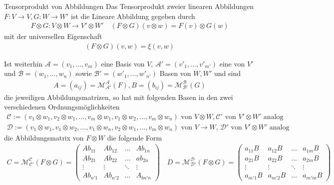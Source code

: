 \begin{definition}{Tensorprodukt von Abbildungen}
    Das Tensorprodukt zweier linearen Abbildungen $F: V \to V, G: W \to W'$ ist die Lineare Abbildung gegeben durch
    \begin{align*}
        F \otimes G: V \otimes W \to V' \otimes W' \quad (F \otimes G)(v \otimes w) = F(v) \otimes G(w)
    \end{align*}
    mit der universellen Eigenschaft 
    \begin{align*}
        (F \otimes G)(v,w) = \xi(v,w)
    \end{align*}
\end{definition}
Ist weiterhin $\mathcal{A} = (v_{1}, \ldots, v_{m})$ eine Basis von $V$, $\mathcal{A'} = (v'_{1}, \ldots, v'_{m'})$ eine von $V'$ und $\mathcal{B} = (w_{1}, \ldots, w_{n})$ sowie $\mathcal{B'} = (w'_{1}, \ldots, w'_{n'})$ Basen von $W,W'$ und sind 
\begin{align*}
    A = (a_{ij}) = \mathcal{M}_{\mathcal{A'}}^{\mathcal{A}}(F), B = (b_{ij}) = \mathcal{M}_{\mathcal{B'}}^{\mathcal{B}}(G)
\end{align*}
die jeweiligen Abbildungsmatrizen, so hat mit folgenden Basen in den zwei verschiedenen Ordnungsmöglichkeiten
\begin{align*}
    \mathcal{C} := (v_1 \otimes w_1, v_2 \otimes w_1, \ldots, v_m \otimes w_1, v_1 \otimes w_2, \ldots, v_m \otimes w_n) \text{ von $V \otimes W, \mathcal{C'}$ von $V' \otimes W'$ analog}\\
    \mathcal{D} := (v_1 \otimes w_1, v_1 \otimes w_2, \ldots, v_1 \otimes w_n, v_2 \otimes w_1, \ldots, v_m \otimes w_n) \text{ von $V \to W$, $\mathcal{D'}$ von $V' \otimes W'$ analog}
\end{align*}
die Abbildungsmatrix von $F \otimes W$ die folgende Form
\begin{align*}
    C = \mathcal{M}_{\mathcal{C}'}^{\mathcal{C}}(F \otimes G) = \begin{pmatrix}
        Ab_{11} & Ab_{12} & \dots & Ab_{1n}\\
        Ab_{21} & Ab_{22} & \dots & ab_{2n}\\
        \vdots & \vdots & \ddots & \vdots\\
        Ab_{n'1} & Ab_{n'2} & \dots & A_{bn'n}
    \end{pmatrix} \quad 
    D = \mathcal{M}_{\mathcal{D}'}^{\mathcal{D}}(F \otimes G) = \begin{pmatrix}
        a_{11}B & a_{12}B & \dots & a_{1m}B\\
        a_{21}B & a_{22}B & \dots & a_{2m}B\\
        \vdots & \vdots & \ddots & \vdots\\
        a_{m'1}B & a_{m'2}B & \dots & a_{m'm}B
    \end{pmatrix}
\end{align*}
